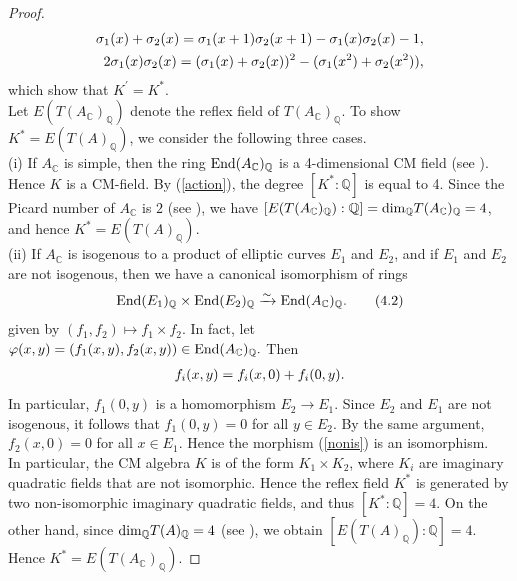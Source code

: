 \documentclass[reqno,a4paper,11pt]{amsart}
\theoremstyle{definition}
\theoremstyle{definition}
\begin{document}
\begin{proof}
          \begin{align}
              \sigma_{1}(x)+\sigma_{2}(x)= \sigma_{1}(x+1)\sigma_{2}(x+1)-\sigma_{1}(x)\sigma_{2}(x)-1,\notag 
              \\ 2\sigma_{1}(x)\sigma_{2}(x)=(\sigma_{1}(x)+\sigma_{2}(x))^{2}-(\sigma_{1}(x^{2})+\sigma_{2}(x^{2})),\notag 
          \end{align}
         which show that $K^{'}=K^{\ast}$. 
      \\\indent Let $E(T(A_{\mathbb{C}})_{\mathbb{Q}})$ denote the reflex field of $T(A_{\mathbb{C}})_{\mathbb{Q}}$. To show  $K^{\ast}=E(T(A)_{\mathbb{Q}})$, we consider the following three cases.
         \\\indent (i) If $A_{\mathbb{C}}$ is simple, then the ring ${\rm End}(A_{\mathbb{C}})_{\mathbb{Q}}$ is a 4-dimensional CM field (see \cite[1.3.6.4. Proposition]{cco}). Hence $K$ is a CM-field. By (\ref{action}), the degree $[K^{\ast}: \mathbb{Q}]$ is equal to 4. Since the Picard number of $A_{\mathbb{C}}$ is $2$ (see \cite[Lemma 3.3]{murty}), we have $[E(T(A_{\mathbb{C}})_{\mathbb{Q}}): \mathbb{Q}]={\rm dim}_{\mathbb{Q}}T(A_{\mathbb{C}})_{\mathbb{Q}}=4$, and hence $K^{\ast}=E(T(A)_{\mathbb{Q}})$. 
       \\\indent (ii) If $A_{\mathbb{C}}$ is isogenous to a product of elliptic curves $E_{1}$ and $ E_{2}$, and if  $E_{1}$ and $E_{2}$ are not isogenous, then we have a canonical isomorphism of rings
       \begin{align}\label{nonis}
           {\rm End}(E_{1})_{\mathbb{Q}}\times {\rm End}(E_{2})_{\mathbb{Q}}\xrightarrow{\sim} {\rm End}(A_{\mathbb{C}})_{\mathbb{Q}}. \tag{4.2}
       \end{align} given by  $(f_{1}, f_{2})\mapsto f_{1}\times f_{2}$. 
       In fact, let $\varphi(x, y)=(f_{1}(x, y), f_{2}(x, y))\in {\rm End}(A_{\mathbb{C}})_{\mathbb{Q}}.$  Then  
       \begin{align}
           f_{i}(x, y)=f_{i}(x, 0)+f_{i}(0, y). \notag 
       \end{align}
       In particular, $f_{1}(0, y)$ is a homomorphism $E_{2}\to E_{1}$. Since $E_{2}$ and $E_{1}$ are not isogenous, it follows that $f_{1}(0, y)=0$ for all $y\in E_{2}$. By the same argument,  $f_{2}(x, 0)=0$ for all $x\in E_{1}$.  Hence the morphism (\ref{nonis}) is an isomorphism. 
      \\\indent In particular, the CM algebra $K$ is of the form  $K_{1}\times K_{2}$, where $K_{i}$ are imaginary quadratic fields that are not isomorphic. Hence the reflex field $K^{\ast}$ is generated by two non-isomorphic imaginary quadratic fields, and thus $[K^{\ast}:\mathbb{Q}]=4$. On the other hand, since  ${\rm dim}_{\mathbb{Q}}T(A)_{\mathbb{Q}}=4$ (see \cite[Corollary 2.3]{hulek}), we obtain  $[E(T(A)_{\mathbb{Q}}):\mathbb{Q}]=4$.  Hence $K^{\ast}=E(T(A_{\mathbb{C}})_{\mathbb{Q}})$. 

\end{proof}
\end{document}
